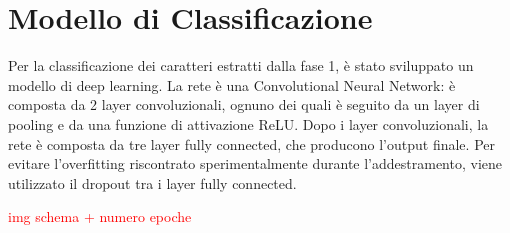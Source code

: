 \chapter{Modello di Classificazione}

Per la classificazione dei caratteri estratti dalla fase 1, è stato sviluppato un modello di deep learning. La rete è una Convolutional Neural Network: è composta da 2 layer convoluzionali, ognuno dei quali è seguito da un layer di pooling e da una funzione di attivazione ReLU. Dopo i layer convoluzionali, la rete è composta da tre layer fully connected, che producono l'output finale. Per evitare l'overfitting riscontrato sperimentalmente durante l'addestramento, viene utilizzato il dropout tra i layer fully connected.

\textcolor{red}{img schema + numero epoche}


